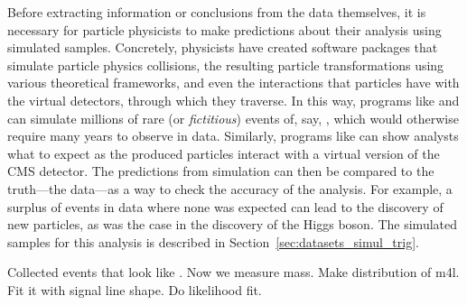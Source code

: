 Before extracting information or conclusions from the data themselves, it is necessary for particle physicists to make predictions about their analysis using simulated samples.
Concretely, physicists have created software packages that simulate particle physics collisions,
the resulting particle transformations using various theoretical frameworks,
and even the interactions that particles have with the virtual detectors, through which they traverse.
In this way, programs like \MGvATNLO and \POWHEG can simulate millions of rare (or \emph{fictitious}) events of, say, \hzzfourl, which would otherwise require many years to observe in data.
Similarly, programs like \GEANTfour can show analysts what to expect as the produced particles interact with a virtual version of the CMS detector.
The predictions from simulation can then be compared to the truth---the data---as a way to check the accuracy of the analysis.
For example, a surplus of events in data where none was expected can lead to the discovery of new particles, as was the case in the discovery of the Higgs boson.
The simulated samples for this analysis is described in Section~\ref{sec:datasets_simul_trig}.

Collected events that look like \hzzfourl.
Now we measure mass.
Make distribution of m4l.
Fit it with signal line shape.
Do likelihood fit.